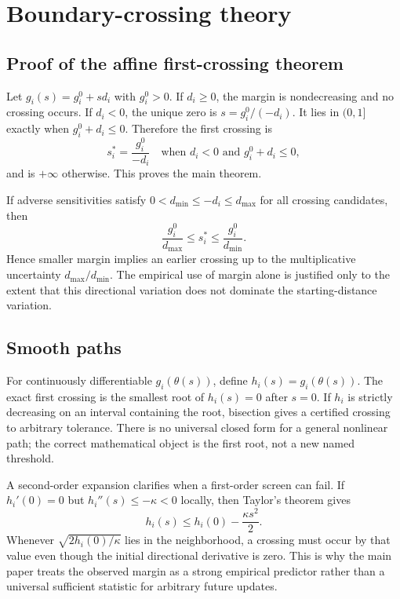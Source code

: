 \documentclass[11pt,letterpaper]{article}
\theoremstyle{plain}
\newcommand{\1}{\mathbf 1}
\begin{document}
\section{Boundary-crossing theory}
\subsection{Proof of the affine first-crossing theorem}
Let $g_i(s)=g_i^0+s d_i$ with $g_i^0>0$. If $d_i\ge0$, the margin is nondecreasing and no crossing occurs. If $d_i<0$, the unique zero is $s=g_i^0/(-d_i)$. It lies in $(0,1]$ exactly when $g_i^0+d_i\le0$. Therefore the first crossing is
\begin{equation}
 s_i^*=\frac{g_i^0}{-d_i}
\quad\text{when }d_i<0\text{ and }g_i^0+d_i\le0,
\label{eq:s_affineproof}
\end{equation}
and is $+\infty$ otherwise. This proves the main theorem.

If adverse sensitivities satisfy $0<d_{\min}\le -d_i\le d_{\max}$ for all crossing candidates, then
\begin{equation}
 \frac{g_i^0}{d_{\max}}\le s_i^*\le \frac{g_i^0}{d_{\min}}.
\label{eq:s_bounds}
\end{equation}
Hence smaller margin implies an earlier crossing up to the multiplicative uncertainty $d_{\max}/d_{\min}$. The empirical use of margin alone is justified only to the extent that this directional variation does not dominate the starting-distance variation.

\subsection{Smooth paths}
For continuously differentiable $g_i(\theta(s))$, define $h_i(s)=g_i(\theta(s))$. The exact first crossing is the smallest root of $h_i(s)=0$ after $s=0$. If $h_i$ is strictly decreasing on an interval containing the root, bisection gives a certified crossing to arbitrary tolerance. There is no universal closed form for a general nonlinear path; the correct mathematical object is the first root, not a new named threshold.

A second-order expansion clarifies when a first-order screen can fail. If $h_i'(0)=0$ but $h_i''(s)\le-\kappa<0$ locally, then Taylor's theorem gives
\begin{equation}
 h_i(s)\le h_i(0)-\frac{\kappa s^2}{2}.
\label{eq:s_second}
\end{equation}
Whenever $\sqrt{2h_i(0)/\kappa}$ lies in the neighborhood, a crossing must occur by that value even though the initial directional derivative is zero. This is why the main paper treats the observed margin as a strong empirical predictor rather than a universal sufficient statistic for arbitrary future updates.
\end{document}
